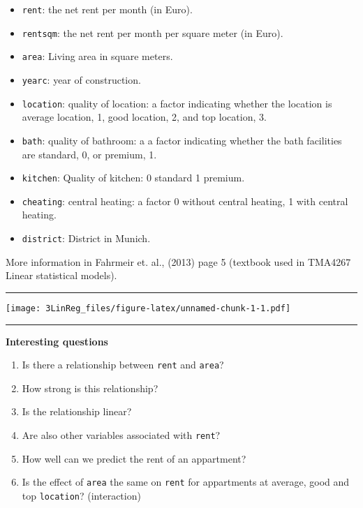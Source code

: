 \documentclass[]{article}
\providecommand{\tightlist}{%
  \setlength{\itemsep}{0pt}\setlength{\parskip}{0pt}}
\begin{document}
\begin{itemize}
\tightlist
\item
  \texttt{rent}: the net rent per month (in Euro).
\item
  \texttt{rentsqm}: the net rent per month per square meter (in Euro).
\item
  \texttt{area}: Living area in square meters.
\item
  \texttt{yearc}: year of construction.
\item
  \texttt{location}: quality of location: a factor indicating whether
  the location is average location, 1, good location, 2, and top
  location, 3.
\item
  \texttt{bath}: quality of bathroom: a a factor indicating whether the
  bath facilities are standard, 0, or premium, 1.
\item
  \texttt{kitchen}: Quality of kitchen: 0 standard 1 premium.
\item
  \texttt{cheating}: central heating: a factor 0 without central
  heating, 1 with central heating.
\item
  \texttt{district}: District in Munich.
\end{itemize}

More information in Fahrmeir et. al., (2013) page 5 (textbook used in
TMA4267 Linear statistical models).

\begin{center}\rule{0.5\linewidth}{\linethickness}\end{center}

\texttt{[image: 3LinReg\_files/figure-latex/unnamed-chunk-1-1.pdf]}

\begin{center}\rule{0.5\linewidth}{\linethickness}\end{center}

\textbf{Interesting questions}

\begin{enumerate}
\def\labelenumi{\arabic{enumi}.}
\tightlist
\item
  Is there a relationship between \texttt{rent} and \texttt{area}?
\item
  How strong is this relationship?
\item
  Is the relationship linear?
\item
  Are also other variables associated with \texttt{rent}?
\item
  How well can we predict the rent of an appartment?
\item
  Is the effect of \texttt{area} the same on \texttt{rent} for
  appartments at average, good and top \texttt{location}? (interaction)
\end{enumerate}
\end{document}
